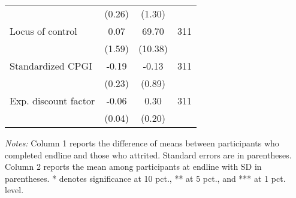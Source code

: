 \begin{table}[h]
{\begin{threeparttable}
\begin{tabular}{l*{3}{c}}
          &   (0.26)&   (1.30)&         \\
Locus of control&     0.07&    69.70&      311\\
          &   (1.59)&  (10.38)&         \\
Standardized CPGI&    -0.19&    -0.13&      311\\
          &   (0.23)&   (0.89)&         \\
Exp. discount factor&-0.06\sym{*}&     0.30&      311\\
          &   (0.04)&   (0.20)&         \\
\bottomrule \end{tabular} \begin{tablenotes}[flushleft] \footnotesize \item \emph{Notes:} Column 1 reports the difference of means between participants who completed endline and those who attrited. Standard errors are in parentheses. Column 2 reports the mean among participants at endline with SD in parentheses. * denotes significance at 10 pct., ** at 5 pct., and *** at 1 pct. level. \end{tablenotes} \end{threeparttable} } \end{table}

